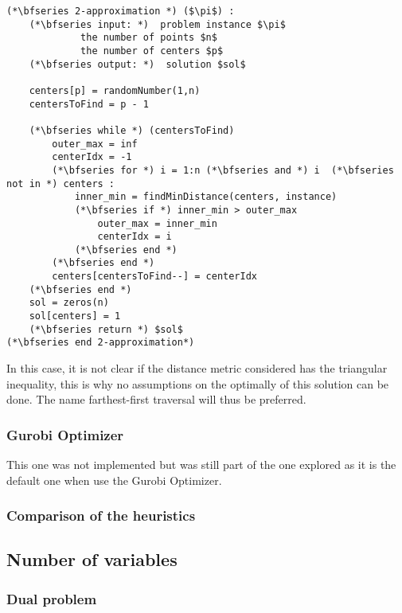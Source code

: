 \documentclass[a4paper,10pt]{article}
\begin{document}
\begin{lstlisting}[mathescape=true]
(*\bfseries 2-approximation *) ($\pi$) :
    (*\bfseries input: *)  problem instance $\pi$
             the number of points $n$
             the number of centers $p$
    (*\bfseries output: *)  solution $sol$
    
    centers[p] = randomNumber(1,n)
    centersToFind = p - 1
    
    (*\bfseries while *) (centersToFind)
        outer_max = inf
        centerIdx = -1
        (*\bfseries for *) i = 1:n (*\bfseries and *) i  (*\bfseries not in *) centers :
            inner_min = findMinDistance(centers, instance)
            (*\bfseries if *) inner_min > outer_max
                outer_max = inner_min
                centerIdx = i
            (*\bfseries end *)
        (*\bfseries end *)
        centers[centersToFind--] = centerIdx
    (*\bfseries end *)
    sol = zeros(n)
    sol[centers] = 1
    (*\bfseries return *) $sol$
(*\bfseries end 2-approximation*)
\end{lstlisting}

In this case, it is not clear if the distance metric considered has the triangular inequality, this is why no assumptions on the optimally of this solution can be done. The name farthest-first traversal will thus be preferred. 


\subsubsection{Gurobi Optimizer}

This one was not implemented but was still part of the one explored as it is the default one when use the Gurobi Optimizer.

\subsubsection{Comparison of the heuristics}


\subsection{Number of variables}

\subsubsection{Dual problem}
\end{document}
